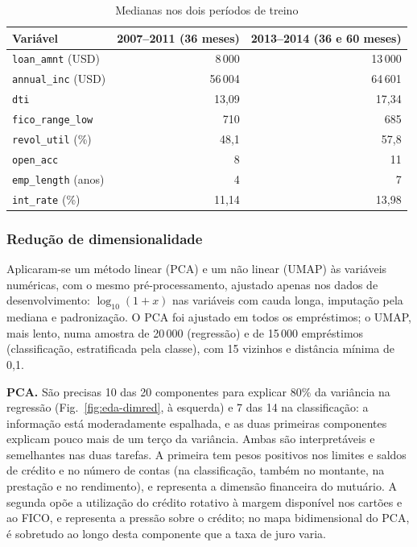 \begin{table}[!t]
\caption{Medianas nos dois períodos de treino}
\label{tab:eda-periodos}
\centering
\footnotesize
\begin{tabular}{|l|r|r|}
\hline
\textbf{Variável} & \textbf{2007--2011 (36 meses)} & \textbf{2013--2014 (36 e 60 meses)} \\
\hline
\texttt{loan\_amnt} (USD)  & 8\,000  & 13\,000 \\
\texttt{annual\_inc} (USD) & 56\,004 & 64\,601 \\
\texttt{dti}               & 13,09   & 17,34   \\
\texttt{fico\_range\_low}  & 710     & 685     \\
\texttt{revol\_util} (\%)  & 48,1    & 57,8    \\
\texttt{open\_acc}         & 8       & 11      \\
\texttt{emp\_length} (anos) & 4      & 7       \\
\texttt{int\_rate} (\%)    & 11,14   & 13,98   \\
\hline
\end{tabular}
\end{table}

\subsubsection{Redução de dimensionalidade}

Aplicaram-se um método linear (PCA) e um não linear (UMAP) às variáveis numéricas, com o
mesmo pré-processamento, ajustado apenas nos dados de desenvolvimento:
$\log_{10}(1+x)$ nas variáveis com cauda longa, imputação pela mediana e padronização.
O PCA foi ajustado em todos os empréstimos; o UMAP, mais lento, numa amostra de
20\,000 (regressão) e de 15\,000 empréstimos (classificação, estratificada pela classe),
com 15 vizinhos e distância mínima de 0,1.

\textbf{PCA.} São precisas 10 das 20 componentes para explicar 80\% da variância na
regressão (Fig.~\ref{fig:eda-dimred}, à esquerda) e 7 das 14 na classificação: a
informação está moderadamente espalhada, e as duas primeiras componentes explicam pouco
mais de um terço da variância. Ambas são interpretáveis e semelhantes nas duas tarefas.
A primeira tem pesos positivos nos limites e saldos de crédito e no número de contas (na
classificação, também no montante, na prestação e no rendimento), e representa a
dimensão financeira do mutuário. A segunda opõe a utilização do crédito rotativo à
margem disponível nos cartões e ao FICO, e representa a pressão sobre o crédito; no mapa
bidimensional do PCA, é sobretudo ao longo desta componente que a taxa de juro varia.

